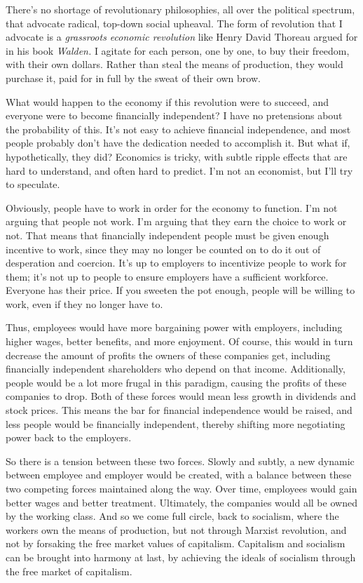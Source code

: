 There's no shortage of revolutionary philosophies, all over the political spectrum, that advocate radical, top-down social upheaval. The form of revolution that I advocate is a \emph{grassroots economic revolution} like Henry David Thoreau argued for in his book \emph{Walden.} I agitate for each person, one by one, to buy their freedom, with their own dollars. Rather than steal the means of production, they would purchase it, paid for in full by the sweat of their own brow.

What would happen to the economy if this revolution were to succeed, and everyone were to become financially independent? I have no pretensions about the probability of this. It's not easy to achieve financial independence, and most people probably don't have the dedication needed to accomplish it. But what if, hypothetically, they did? Economics is tricky, with subtle ripple effects that are hard to understand, and often hard to predict. I'm not an economist, but I'll try to speculate.

Obviously, people have to work in order for the economy to function. I'm not arguing that people not work. I'm arguing that they earn the choice to work or not. That means that financially independent people must be given enough incentive to work, since they may no longer be counted on to do it out of desperation and coercion. It's up to employers to incentivize people to work for them; it's not up to people to ensure employers have a sufficient workforce. Everyone has their price. If you sweeten the pot enough, people will be willing to work, even if they no longer have to.

Thus, employees would have more bargaining power with employers, including higher wages, better benefits, and more enjoyment. Of course, this would in turn decrease the amount of profits the owners of these companies get, including financially independent shareholders who depend on that income. Additionally, people would be a lot more frugal in this paradigm, causing the profits of these companies to drop. Both of these forces would mean less growth in dividends and stock prices. This means the bar for financial independence would be raised, and less people would be financially independent, thereby shifting more negotiating power back to the employers.

So there is a tension between these two forces. Slowly and subtly, a new dynamic between employee and employer would be created, with a balance between these two competing forces maintained along the way. Over time, employees would gain better wages and better treatment. Ultimately, the companies would all be owned by the working class. And so we come full circle, back to socialism, where the workers own the means of production, but not through Marxist revolution, and not by forsaking the free market values of capitalism. Capitalism and socialism can be brought into harmony at last, by achieving the ideals of socialism through the free market of capitalism.


